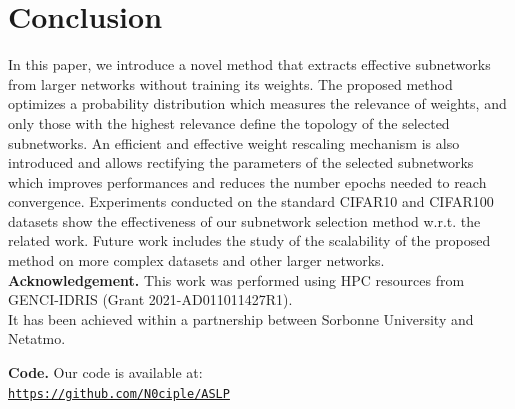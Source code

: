 \section{Conclusion}

In this paper, we introduce a novel method that extracts effective subnetworks
from larger networks without training its weights. The proposed method optimizes
a probability distribution which measures the relevance of weights, and only
those with the highest relevance define the topology of the selected
subnetworks. An efficient and effective weight rescaling mechanism is also
introduced and allows rectifying the parameters of the selected subnetworks
which improves performances and reduces the number epochs needed to reach
convergence. Experiments conducted on the standard CIFAR10 and  CIFAR100
datasets show the effectiveness of our subnetwork selection method w.r.t. the
related work. Future work includes the study of the scalability of the proposed
method on more complex datasets and other larger networks.\\

\noindent\textbf{Acknowledgement.} 
This work was performed using HPC resources from GENCI-IDRIS (Grant 2021-AD011011427R1). \\
It has been achieved within a partnership between Sorbonne University and Netatmo.

\noindent\textbf{Code.} Our code is available at:\\ \href{https://github.com/N0ciple/ASLP}{\texttt{https://github.com/N0ciple/ASLP}}
